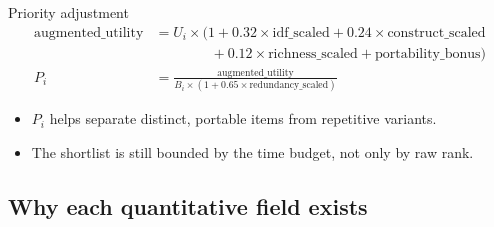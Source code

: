\documentclass[12pt]{article}
\begin{document}
\begin{psidbox}{Priority adjustment}
\begin{align*}
\text{augmented\_utility} &= U_i \times \bigl(1 + 0.32 \times \text{idf\_scaled} + 0.24 \times \text{construct\_scaled} \\
&\qquad\qquad + 0.12 \times \text{richness\_scaled} + \text{portability\_bonus}\bigr) \\
P_i &= \frac{\text{augmented\_utility}}{B_i \times (1 + 0.65 \times \text{redundancy\_scaled})}
\end{align*}

\begin{itemize}
\item $P_i$ helps separate distinct, portable items from repetitive variants.
\item The shortlist is still bounded by the time budget, not only by raw rank.
\end{itemize}
\end{psidbox}

\subsection{Why each quantitative field exists}
\end{document}
